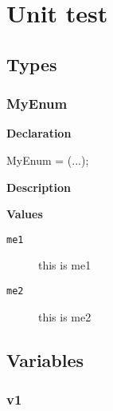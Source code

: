 \documentclass{report}
\newif\ifpdf
\begin{document}
\label{toc}\tableofcontents
\newpage
\newlength{\tmplength}
\chapter{Unit test}
\label{test}
\section{Types}
\ifpdf
\subsection*{\large{\textbf{MyEnum}}\normalsize\hspace{1ex}\hrulefill}
\else
\subsection*{MyEnum}
\fi
\label{test-MyEnum}
\begin{list}{}{
\setlength{\itemindent}{0cm}
\setlength{\listparindent}{0cm}
\setlength{\leftmargin}{\evensidemargin}
\addtolength{\leftmargin}{\tmplength}
\settowidth{\labelsep}{X}
\addtolength{\leftmargin}{\labelsep}
\setlength{\labelwidth}{\tmplength}
}
\item[\textbf{Declaration}\hfill]
\ifpdf
\begin{flushleft}
\fi
\begin{ttfamily}
MyEnum = (...);\end{ttfamily}

\ifpdf
\end{flushleft}
\fi

\par
\item[\textbf{Description}]
 \item[\textbf{Values}]
\begin{description}
\item[\texttt{me1}] \label{test-me1}
\index{}
this is me1
\item[\texttt{me2}] \label{test-me2}
\index{}
this is me2
\end{description}


\end{list}
\section{Variables}
\ifpdf
\subsection*{\large{\textbf{v1}}\normalsize\hspace{1ex}\hrulefill}
\else
\end{document}
